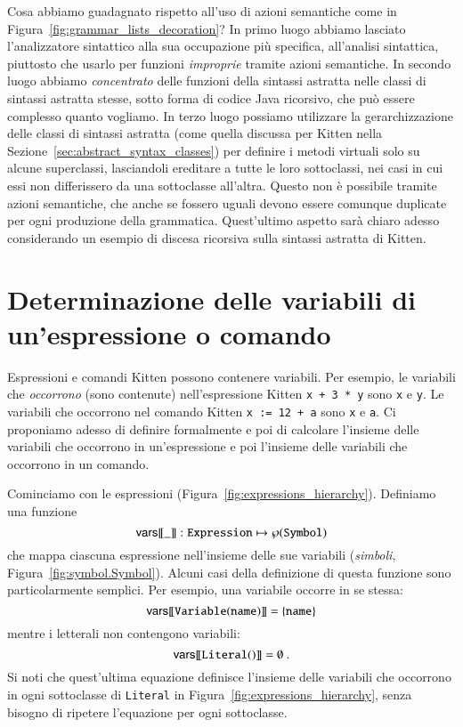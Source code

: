 Cosa abbiamo guadagnato rispetto all'uso di azioni semantiche come
in Figura~\ref{fig:grammar_lists_decoration}? In primo luogo abbiamo lasciato
l'analizzatore sintattico alla sua occupazione pi\`u specifica, \cioe
all'analisi sintattica, piuttosto che usarlo per funzioni \emph{improprie}
tramite azioni semantiche. In secondo luogo abbiamo \emph{concentrato}
delle funzioni della sintassi astratta nelle classi di sintassi astratta
stesse, sotto forma di codice Java ricorsivo, che pu\`o essere complesso
quanto vogliamo. In terzo luogo possiamo utilizzare la gerarchizzazione delle
classi di sintassi astratta (come quella discussa per Kitten nella
Sezione~\ref{sec:abstract_syntax_classes}) per definire i metodi virtuali
solo su alcune superclassi, lasciandoli ereditare a tutte le loro sottoclassi,
nei casi in cui essi non differissero da una sottoclasse all'altra.
Questo non \`e possibile tramite azioni semantiche, che anche se fossero uguali
devono essere comunque duplicate per ogni produzione della grammatica.
Quest'ultimo aspetto sar\`a chiaro adesso considerando un esempio di
discesa ricorsiva sulla sintassi astratta di Kitten.
%
\section{Determinazione delle variabili di un'espressione o comando}
  \label{sec:free_variables}
%
Espressioni e comandi Kitten possono contenere variabili.
Per esempio, le variabili che \emph{occorrono} (sono contenute)
nell'espressione Kitten \texttt{x + 3 * y} sono \texttt{x} e \texttt{y}.
Le variabili che occorrono nel comando Kitten
\texttt{x := 12 + a} sono \texttt{x} e \texttt{a}.
Ci proponiamo adesso di definire formalmente e poi di calcolare l'insieme delle
variabili che occorrono in un'espressione e poi l'insieme delle variabili che
occorrono in un comando.

Cominciamo con le espressioni (Figura~\ref{fig:expressions_hierarchy}).
Definiamo una funzione
\[
  {\mathsf{vars}[\![{\_}]\!]}:\mathtt{Expression}\mapsto\wp(\mathtt{Symbol})
\]
che mappa ciascuna espressione nell'insieme delle sue variabili
(\emph{simboli}, Figura~\ref{fig:symbol.Symbol}). Alcuni casi della
definizione di questa funzione sono particolarmente semplici. Per esempio,
una variabile occorre in se stessa:
\begin{equation}\label{eq:vars_variable}
  {\mathsf{vars}[\![{\mathtt{Variable(name)}}]\!]}=\{\mathtt{name}\}
\end{equation}
mentre i letterali non contengono variabili:
\begin{equation}\label{eq:vars_literal}
  {\mathsf{vars}[\![{\mathtt{Literal()}}]\!]}=\emptyset~.
\end{equation}
Si noti che quest'ultima equazione definisce l'insieme delle variabili che
occorrono in ogni sottoclasse di \texttt{Literal} in
Figura~\ref{fig:expressions_hierarchy}, senza bisogno di ripetere l'equazione
per ogni sottoclasse.

